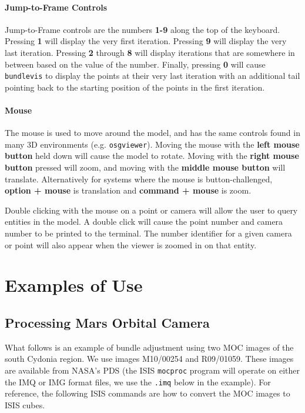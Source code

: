 \paragraph{Jump-to-Frame Controls}
Jump-to-Frame controls are the numbers \textbf{1-9} along the top of
the keyboard. Pressing \textbf{1} will display the very first
iteration. Pressing \textbf{9} will display the very last
iteration. Pressing \textbf{2} through \textbf{8} will display
iterations that are somewhere in between based on the value of the
number. Finally, pressing \textbf{0} will cause \texttt{bundlevis} to
display the points at their very last iteration with an additional
tail pointing back to the starting position of the points in the first
iteration.

\paragraph{Mouse}
The mouse is used to move around the model, and has the same controls
found in many 3D environments (e.g. \texttt{osgviewer}). Moving the
mouse with the \textbf{left mouse button} held down will cause the
model to rotate.  Moving with the \textbf{right mouse button} pressed
will zoom, and moving with the \textbf{middle mouse button} will
translate. Alternatively for systems where the mouse is
button-challenged, \textbf{option + mouse} is translation and
\textbf{command + mouse} is zoom.

Double clicking with the mouse on a point or camera will allow the
user to query entities in the model.  A double click will cause the
point number and camera number to be printed to the terminal. The
number identifier for a given camera or point will also appear when
the viewer is zoomed in on that entity.

\section{Examples of Use}
\label{sec:ba_example}

\subsection{Processing Mars Orbital Camera}

What follows is an example of bundle adjustment using two \ac{MOC}
images of the south Cydonia region. We use images M10/00254 and
R09/01059. These images are available from NASA's \ac{PDS} (the
\ac{ISIS} \texttt{mocproc} program will operate on either the IMQ
or IMG format files, we use the \texttt{.imq} below in the example).
For reference, the following \ac{ISIS} commands are how to convert
the \ac{MOC} images to \ac{ISIS} cubes.


